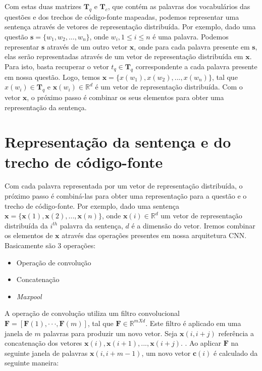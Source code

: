 Com estas duas matrizes $\bm{T}_{q}$ e $\bm{T}_{c}$, que contém as palavras dos vocabulários das questões e dos trechos de código-fonte mapeadas, podemos representar uma sentença através de vetores de representação distribuída. Por exemplo, dado uma questão $\bm{s} = \{ w_{1}, w_{2}, . . ., w_{n}\}$, onde $w_{i}, 1 \leq i \leq n$ é uma palavra. Podemos representar $\bm{s}$ através de um outro vetor $\bm{x}$, onde para cada palavra presente em $\bm{s}$, elas serão representadas através de um vetor de representação distribuída em $\bm{x}$. Para isto, basta recuperar o vetor $t_{q} \in \bm{T}_{q}$ correspondente a cada palavra presente em nossa questão. Logo, temos $\bm{x} = \{ x(w_{1}), x(w_{2}), . . ., x(w_{n})\}$, tal que $x(w_{i}) \in \bm{T}_{q}$ e $\bm{x}(w_{i}) \in \mathbb{R}^{d}$ é um vetor de representação distribuída. Com o vetor $\bm{x}$, o próximo passo é combinar os seus elementos para obter uma representação da sentença.





\section{Representação da sentença e do trecho de código-fonte}
\label{sec:representacao-sentenca}

Com cada palavra representada por um vetor de representação distribuída, o próximo passo é combiná-las para obter uma representação para a questão e o trecho de código-fonte. Por exemplo, dado uma sentença $\bm{x} = \{ \bm{x}(1), \bm{x}(2), . . ., \bm{x}(n) \}$, onde $\bm{x}(i) \in \mathbb{R}^{d}$ um vetor de representação distribuída da $i^{th}$ palavra da sentença, $d$ é a dimensão do vetor. Iremos combinar os elementos de $\bm{x}$ através das operações presentes em nossa arquitetura CNN. Basicamente são 3 operações:

\begin{itemize}
    \item Operação de convolução
    \item Concatenação
    \item \textit{Maxpool}
\end{itemize}

A operação de convolução utiliza um filtro convolucional $\bm{F}  = [\bm{F}(1),· · ·, \bm{F}(m)]$, tal que $\bm{F} \in \mathbb{R}^{m X d}$. Este filtro é aplicado em uma janela de $m$ palavras para produzir um novo vetor.
Seja $\bm{x}(i, i + j)$ referência a concatenação dos vetores $\bm{x}(i), \bm{x}(i + 1), . . ., \bm{x}(i + j)$. . Ao aplicar $\bm{F}$ na seguinte janela de palavras $\bm{x}(i, i + m - 1)$, um novo vetor $\bm{c}(i)$ é calculado da seguinte maneira:


